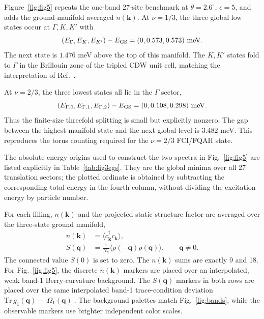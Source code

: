 \documentclass[10pt,twocolumn]{article}
\begin{document}
Figure~\ref{fig:fig5} repeats the one-band 27-site benchmark at $\theta=2.6^\circ$, $\epsilon=5$, and adds the ground-manifold averaged $n(\bm k)$.  At $\nu=1/3$, the three global low states occur at $\Gamma,K,K'$ with
\begin{equation}
(E_\Gamma,E_K,E_{K'})-E_{\rm GS}=(0,0.573,0.573)\ \mathrm{meV}.
\end{equation}
The next state is $1.476$ meV above the top of this manifold.  The $K,K'$ states fold to $\Gamma$ in the Brillouin zone of the tripled CDW unit cell, matching the interpretation of Ref.~\cite{luo}.

At $\nu=2/3$, the three lowest states all lie in the $\Gamma$ sector,
\begin{equation}
(E_{\Gamma,0},E_{\Gamma,1},E_{\Gamma,2})-E_{\rm GS}
=(0,0.108,0.298)\ \mathrm{meV}.
\end{equation}
Thus the finite-size threefold splitting is small but explicitly nonzero.  The gap between the highest manifold state and the next global level is $3.482$ meV.  This reproduces the torus counting required for the $\nu=2/3$ FCI/FQAH state.

The absolute energy origins used to construct the two spectra in
Fig.~\ref{fig:fig5} are listed explicitly in Table~\ref{tab:fig3egs}.
They are the global minima over all 27 translation sectors; the plotted
ordinate is obtained by subtracting the corresponding total energy in the
fourth column, without dividing the excitation energy by particle number.
\begin{table}[H]
\centering
\caption{Absolute one-band, 27-cell ground-state energies used as the
zero of the Fig.~\ref{fig:fig5} spectra.}
\label{tab:fig3egs}
\end{table}

For each filling, $n(\bm k)$ and the projected static structure factor are averaged over the three-state ground manifold,
\begin{align}
n(\bm k)&=\langle c^\dagger_{\bm k}c_{\bm k}\rangle,\\
S(\bm q)&=\frac{1}{N_h}\langle\rho(-\bm q)\rho(\bm q)\rangle,\qquad \bm q\ne0.
\end{align}
The connected value $S(0)$ is set to zero.  The $n(\bm k)$ sums are exactly 9 and 18.  For Fig.~\ref{fig:fig5}, the discrete $n(\bm k)$ markers are placed over an interpolated, weak band-1 Berry-curvature background.  The $S(\bm q)$ markers in both rows are placed over the same interpolated band-1 trace-condition deviation $\mathrm{Tr}\,g_1(\bm q)-|\Omega_1(\bm q)|$.  The background palettes match Fig.~\ref{fig:bands}, while the observable markers use brighter independent color scales.
\end{document}
